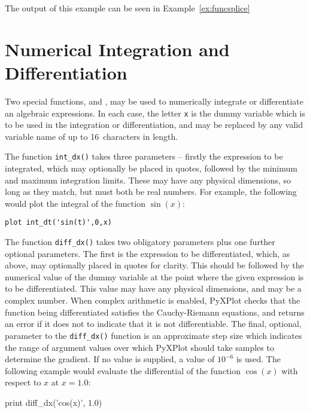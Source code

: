 \noindent The output of this example can be seen in Example~\ref{ex:funcsplice}

\section{Numerical Integration and Differentiation}

 Two special functions,
 and , may be used to numerically
integrate or differentiate an algebraic expressions.  In each case, the letter
{\tt x} is the dummy variable which is to be used in the integration or
differentiation, and may be replaced by any valid variable name of up to
16~characters in length.

The function {\tt int\_dx()} takes three parameters -- firstly the expression
to be integrated, which may optionally be placed in quotes, followed by the
minimum and maximum integration limits. These may have any physical dimensions,
so long as they match, but must both be real numbers. For example, the
following would plot the integral of the function $\sin(x)$:

\begin{verbatim}
plot int_dt('sin(t)',0,x)
\end{verbatim} 

The function {\tt diff\_dx()} takes two obligatory parameters plus one further
optional parameters. The first is the expression to be differentiated, which,
as above, may optionally placed in quotes for clarity. This should be followed
by the numerical value of the dummy variable at the point where the given
expression is to be differentiated. This value may have any physical
dimensions, and may be a complex number. When complex arithmetic is enabled,
PyXPlot checks that the function being differentiated satisfies the
Cauchy-Riemann equations, and returns an error if it does not to indicate that it
is not differentiable.  The final, optional, parameter to the {\tt diff\_dx()}
function is an approximate step size which indicates the range of argument
values over which PyXPlot should take samples to determine the gradient. If no
value is supplied, a value of $10^{-6}$ is used.  The following example would
evaluate the differential of the function $\cos(x)$ with respect to $x$ at
$x=1.0$:

\begin{dodo}
print diff\_dx('cos(x)', 1.0)
\end{dodo}

